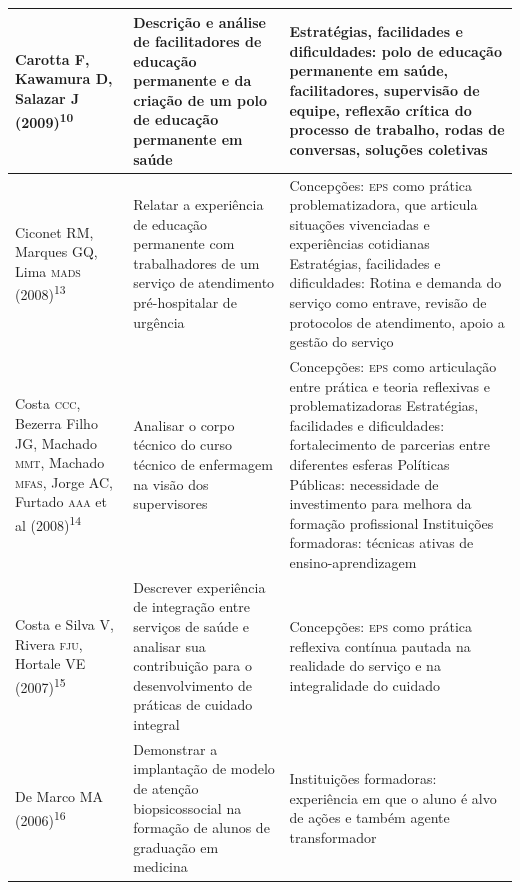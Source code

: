 \documentclass{article}
\begin{document}
\begin{table}
\begin{xtabular}{ l | l | l }
Carotta F, Kawamura D, Salazar J (2009)\textsuperscript{10}

& Descrição e análise de facilitadores de educação permanente e da criação de um
polo de educação permanente em saúde
& Estratégias, facilidades e dificuldades: polo de educação permanente em saúde,
facilitadores, supervisão de equipe, reflexão crítica do processo de trabalho,
rodas de conversas, soluções coletivas
\\ \hline

Ciconet RM, Marques GQ, Lima \textsc{mads} (2008)\textsuperscript{13}

& Relatar a experiência de educação permanente com trabalhadores de um serviço
de atendimento pré-hospitalar de urgência
& Concepções: \textsc{eps} como prática problematizadora, que articula situações
vivenciadas e experiências cotidianas Estratégias, facilidades e dificuldades:
Rotina e demanda do serviço como entrave, revisão de protocolos de atendimento,
apoio a gestão do serviço
\\ \hline

Costa \textsc{ccc}, Bezerra Filho JG, Machado \textsc{mmt}, Machado \textsc{mfas}, Jorge AC, Furtado \textsc{aaa} et
al (2008)\textsuperscript{14}

& Analisar o corpo técnico do curso técnico de enfermagem na visão dos
supervisores
& Concepções: \textsc{eps} como articulação entre prática e teoria reflexivas e
problematizadoras Estratégias, facilidades e dificuldades: fortalecimento de
parcerias entre diferentes esferas Políticas Públicas: necessidade de
investimento para melhora da formação profissional Instituições formadoras:
técnicas ativas de ensino-aprendizagem
\\ \hline

Costa e Silva V, Rivera \textsc{fju}, Hortale VE (2007)\textsuperscript{15}

& Descrever experiência de integração entre serviços de saúde e analisar sua
contribuição para o desenvolvimento de práticas de cuidado integral
& Concepções: \textsc{eps} como prática reflexiva contínua pautada na realidade do
serviço e na integralidade do cuidado
\\ \hline

De Marco MA (2006)\textsuperscript{16}

& Demonstrar a implantação de modelo de atenção biopsicossocial na formação de
alunos de graduação em medicina
& Instituições formadoras: experiência em que o aluno é alvo de ações e também
agente transformador
\\ \hline


\end{xtabular}
\end{table}
\end{document}
